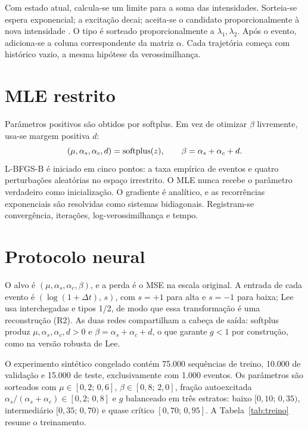 \documentclass[12pt,a4paper,openany]{report}
\begin{document}
Com estado atual, calcula-se um limite para a soma das intensidades. Sorteia-se espera
exponencial; a excitação decai; aceita-se o candidato proporcionalmente à nova
intensidade \citep{ogata1981}. O tipo é sorteado proporcionalmente a
\(\lambda_1,\lambda_2\). Após o evento, adiciona-se a coluna correspondente da matriz
\(\alpha\). Cada trajetória começa com histórico vazio, a mesma hipótese da
verossimilhança.

\section{MLE restrito}

Parâmetros positivos são obtidos por softplus. Em vez de otimizar \(\beta\) livremente,
usa-se margem positiva \(d\):
\[
(\mu,\alpha_s,\alpha_c,d)=\operatorname{softplus}(z),\qquad
\beta=\alpha_s+\alpha_c+d.
\]
L-BFGS-B é iniciado em cinco pontos: a taxa empírica de eventos e quatro perturbações
aleatórias no espaço irrestrito. O MLE nunca recebe o parâmetro verdadeiro como
inicialização. O gradiente é analítico, e as recorrências exponenciais são resolvidas
como sistemas bidiagonais. Registram-se convergência, iterações,
log-verossimilhança e tempo.

\section{Protocolo neural}

O alvo é \((\mu,\alpha_s,\alpha_c,\beta)\), e a perda é o MSE na escala original. A
entrada de cada evento é \((\log(1+\Delta t),\,s)\), com \(s=+1\) para alta e
\(s=-1\) para baixa; Lee usa interchegadas e tipos 1/2, de modo que essa transformação
é uma reconstrução (R2). As duas redes compartilham a cabeça de saída: softplus produz
\(\mu,\alpha_s,\alpha_c,d>0\) e \(\beta=\alpha_s+\alpha_c+d\), o que garante
\(g<1\) por construção, como na versão robusta de Lee.

O experimento sintético congelado contém 75.000 sequências de treino, 10.000 de
validação e 15.000 de teste, exclusivamente com 1.000 eventos. Os parâmetros são
sorteados com \(\mu\in[0{,}2;\,0{,}6]\), \(\beta\in[0{,}8;\,2{,}0]\), fração
autoexcitada \(\alpha_s/(\alpha_s+\alpha_c)\in[0{,}2;\,0{,}8]\) e \(g\) balanceado em
três estratos: baixo \([0{,}10;\,0{,}35)\), intermediário \([0{,}35;\,0{,}70)\) e quase
crítico \([0{,}70;\,0{,}95]\). A Tabela~\ref{tab:treino} resume o treinamento.
\end{document}
